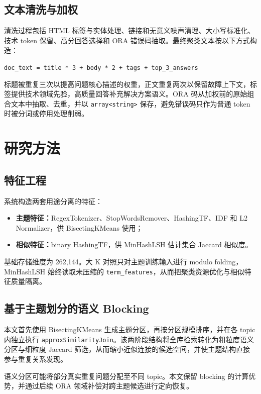 \documentclass[a4paper,UTF8,zihao=5,fontset=windows]{ctexart}
\newcommand{\code}[1]{\texttt{#1}}
\begin{document}
\subsection{文本清洗与加权}

清洗过程包括 HTML 标签与实体处理、链接和无意义噪声清理、大小写标准化、技术 token 保留、高分回答选择和 ORA 错误码抽取。最终聚类文本按以下方式构造：

\begin{center}
\code{doc\_text = title * 3 + body * 2 + tags + top\_3\_answers}
\end{center}

标题被重复三次以提高问题核心描述的权重，正文重复两次以保留故障上下文，标签提供技术领域先验，高质量回答补充解决方案语义。ORA 码从加权前的原始组合文本中抽取、去重，并以 \code{array<string>} 保存，避免错误码只作为普通 token 时被分词或停用处理削弱。

\section{研究方法}

\subsection{特征工程}

系统构造两套用途分离的特征：

\begin{itemize}
  \item \textbf{主题特征：}RegexTokenizer、StopWordsRemover、HashingTF、IDF 和 L2 Normalizer，供 BisectingKMeans 使用；
  \item \textbf{相似特征：}binary HashingTF，供 MinHashLSH 估计集合 Jaccard 相似度。
\end{itemize}

基础存储维度为 262,144。大 K 对照只对主题训练输入进行 modulo folding，MinHashLSH 始终读取未压缩的 \code{term\_features}，从而把聚类资源优化与相似特征质量隔离。

\subsection{基于主题划分的语义 Blocking}

本文首先使用 BisectingKMeans 生成主题分区，再按分区规模排序，并在各 topic 内独立执行 \code{approxSimilarityJoin}。该两阶段结构将全库检索转化为粗粒度语义分区与细粒度 Jaccard 筛选，从而缩小近似连接的候选空间，并使主题结构直接参与重复关系发现。

语义分区可能将部分真实重复问题分配至不同 topic。本文保留 blocking 的计算优势，并通过后续 ORA 领域补偿对跨主题候选进行定向恢复。
\end{document}
